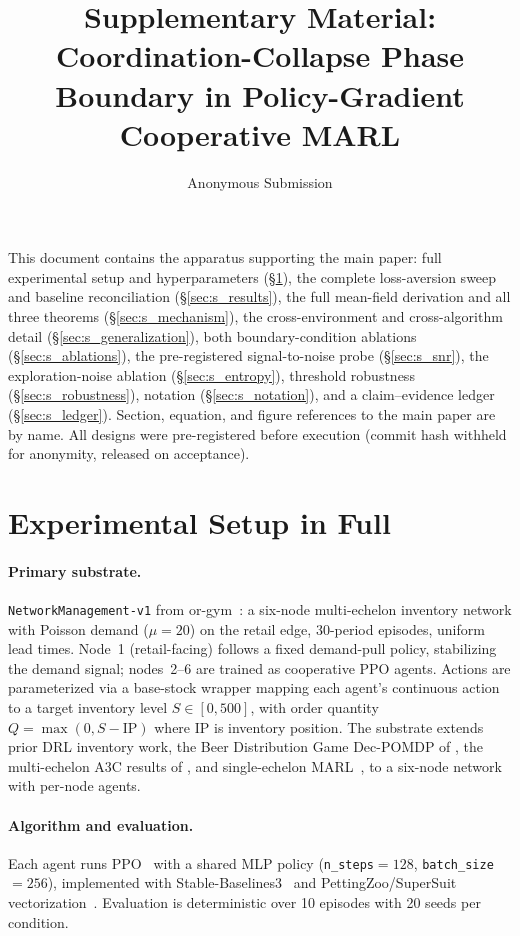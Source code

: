 \documentclass[letterpaper]{article} %
\title{Supplementary Material:\\Coordination-Collapse Phase Boundary in Policy-Gradient Cooperative MARL}
\author{
  Anonymous Submission
}
\theoremstyle{plain}
\begin{document}
\maketitle

\noindent This document contains the apparatus supporting the main paper: full experimental
setup and hyperparameters (\S\ref{sec:s_setup}), the complete loss-aversion sweep and
baseline reconciliation (\S\ref{sec:s_results}), the full mean-field derivation and all three
theorems (\S\ref{sec:s_mechanism}), the cross-environment and cross-algorithm detail
(\S\ref{sec:s_generalization}), both boundary-condition ablations (\S\ref{sec:s_ablations}),
the pre-registered signal-to-noise probe (\S\ref{sec:s_snr}), the exploration-noise ablation
(\S\ref{sec:s_entropy}), threshold robustness (\S\ref{sec:s_robustness}), notation
(\S\ref{sec:s_notation}), and a claim--evidence ledger (\S\ref{sec:s_ledger}). Section,
equation, and figure references to the main paper are by name. All designs were
pre-registered before execution (commit hash withheld for anonymity, released on acceptance).

\section{Experimental Setup in Full}
\label{sec:s_setup}

\paragraph{Primary substrate.}
\texttt{NetworkManagement-v1} from or-gym~\citep{hubbs2020orgym}: a six-node multi-echelon
inventory network with Poisson demand ($\mu{=}20$) on the retail edge, 30-period episodes,
uniform lead times. Node~1 (retail-facing) follows a fixed demand-pull policy, stabilizing
the demand signal; nodes~2--6 are trained as cooperative PPO agents. Actions are
parameterized via a base-stock wrapper mapping each agent's continuous action to a target
inventory level $S\in[0,500]$, with order quantity $Q=\max(0,S-\mathrm{IP})$ where
$\mathrm{IP}$ is inventory position. The substrate extends prior DRL inventory work, the
Beer Distribution Game Dec-POMDP of \citet{oroojlooyjadid2022}, the multi-echelon A3C results
of \citet{gijsbrechts2022}, and single-echelon MARL~\citep{marlim2023}, to a six-node
network with per-node agents.

\paragraph{Algorithm and evaluation.}
Each agent runs PPO~\citep{schulman2017ppo} with a shared MLP policy
(\texttt{n\_steps}${=}128$, \texttt{batch\_size}${=}256$), implemented with
Stable-Baselines3~\citep{raffin2021sb3} and PettingZoo/SuperSuit
vectorization~\citep{terry2021pettingzoo,terry2020supersuit}. Evaluation is deterministic
over 10 episodes with 20 seeds per condition.
\end{document}
